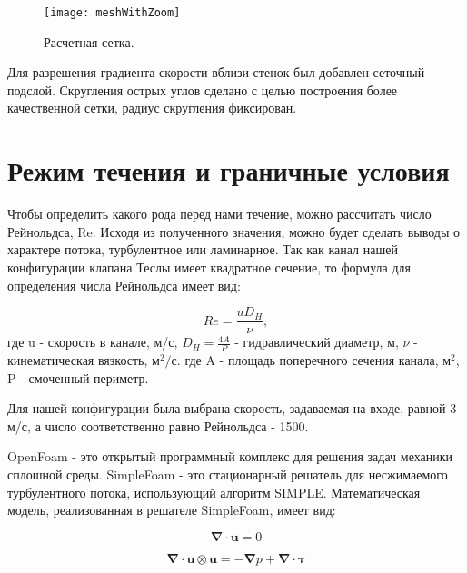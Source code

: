 \documentclass[10pt,a4paper]{book}
\begin{document}
    \begin{figure}[H]
        \centering
        \texttt{[image: meshWithZoom]}
        \caption{Расчетная сетка.}
        \label{fig:teslaMesh2}
    \end{figure}   
    
    Для разрешения градиента скорости вблизи стенок был добавлен сеточный подслой. Скругления острых углов сделано с целью построения более качественной сетки, радиус скругления фиксирован.
    
    \section{Режим течения и граничные условия}        
    
    Чтобы определить какого рода перед нами течение, можно рассчитать число Рейнольдса, Re. Исходя из полученного значения, можно будет сделать выводы о характере потока, турбулентное или ламинарное.
    Так как канал нашей конфигурации клапана Теслы имеет квадратное сечение, то формула для определения числа Рейнольдса имеет вид:
    
    \begin{equation}\label{eqn:Re}
        Re = \frac{u D_{H}}{\nu},
    \end{equation}            
    где  u - скорость в канале, м/с, $ D_{H} = \frac{4A}{P} $ - гидравлический диаметр, м, $\nu$ - кинематическая вязкость, м$^{2}/$с. 
    где A - площадь поперечного сечения канала, м$^{2}$, P - смоченный периметр. 
    
    Для нашей конфигурации была выбрана скорость, задаваемая на входе, равной 3 м/с, а число соответственно равно Рейнольдса - 1500.
    
    OpenFoam - это открытый программный комплекс для решения задач механики сплошной среды. SimpleFoam - это стационарный решатель для несжимаемого турбулентного потока, использующий алгоритм SIMPLE. Математическая модель, реализованная в решателе SimpleFoam, имеет вид:
    
    \begin{equation}\label{eqn:simpleFoam}
        \bm{\nabla} \cdot \bm{u} = 0
    \end{equation} 
    
    \begin{equation}\label{eqn:simpleFoam2}
        \bm{\nabla} \cdot \bm{u} \otimes \bm{u} = -\bm{\nabla} p + \bm{\nabla} \cdot \bm{\tau}
    \end{equation} 
    
\end{document}
